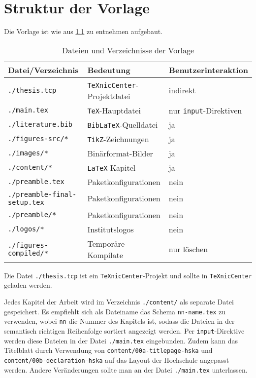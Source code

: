 \chapter{Struktur der Vorlage}

Die Vorlage ist wie aus \cref{tab:files-dirs-of-template} zu entnehmen aufgebaut.
\begin{table}[htbp]
\centering
\begin{tabular}{l l l} \toprule
\bfseries Datei/Verzeichnis        & \bfseries Bedeutung  & \bfseries Benutzerinteraktion \\ \midrule
\verb#./thesis.tcp#                & \texttt{TeXnicCenter}-Projektdatei  &  indirekt \\
\verb#./main.tex#                  & \texttt{TeX}-Hauptdatei  &  nur \texttt{input}-Direktiven \\
\verb#./literature.bib#            & \texttt{BibLaTeX}-Quelldatei  &  ja \\
\verb#./figures-src/*#             & \texttt {TikZ}-Zeichnungen  &  ja \\
\verb#./images/*#                  & Binärformat-Bilder  &  ja \\
\verb#./content/*#                 & \texttt{LaTeX}-Kapitel  &  ja \\
\verb#./preamble.tex#              & Paketkonfigurationen  &  nein \\
\verb#./preamble-final-setup.tex#  & Paketkonfigurationen  &  nein \\
\verb#./preamble/*#                & Paketkonfigurationen  &  nein \\
\verb#./logos/*#                   & Institutslogos  &  nein \\
\verb#./figures-compiled/*#        & Temporäre Kompilate  &  nur löschen \\
\bottomrule
\end{tabular}
\caption{Dateien und Verzeichnisse der Vorlage}
\label{tab:files-dirs-of-template}
\end{table}

Die Datei \texttt{./thesis.tcp} ist ein \texttt{TeXnicCenter}-Projekt und sollte
in \texttt{TeXnicCenter} geladen werden.

Jedes Kapitel der Arbeit wird im Verzeichnis \texttt{./content/}
als separate Datei gespeichert. Es empfiehlt sich als Dateiname das Schema
\texttt{nn-name.tex} zu verwenden, wobei \texttt{nn} die Nummer des Kapitels ist,
sodass die Dateien in der semantisch richtigen Reihenfolge sortiert angezeigt
werden. Per \texttt{input}-Direktive werden diese Dateien in der Datei \texttt{./main.tex}
eingebunden. Zudem kann das Titelblatt durch Verwendung von \texttt{content/00a-titlepage-hska}
und \texttt{content/00b-declaration-hska} auf das Layout der Hochschule angepasst werden.
Andere Veränderungen sollte man an der Datei \texttt{./main.tex} unterlassen.

